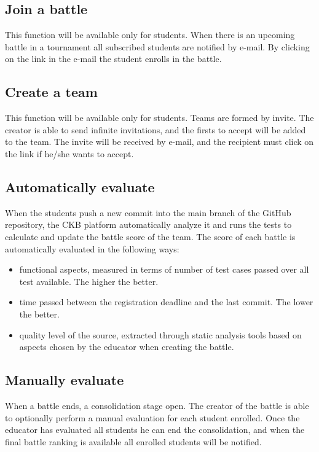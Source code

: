 \subsection{Join a battle}
This function will be available only for students. \newline 
When there is an upcoming battle in a tournament all subscribed students are notified by e-mail. By clicking on the link in the e-mail the student enrolls in the battle. 

\subsection{Create a team}
This function will be available only for students. \newline
Teams are formed by invite. The creator is able to send infinite invitations, and the firsts to accept will be added to the team.  \newline
The invite will be received by e-mail, and the recipient must click on the link if he/she wants to accept. 

\subsection{Automatically evaluate}
When the students push a new commit into the main branch of the GitHub repository, the CKB platform automatically analyze it and runs the tests to calculate and update the battle score of the team.\newline
The score of each battle is automatically evaluated in the following ways:
\begin{itemize}
        \item functional aspects, measured in terms of number of test cases passed over all test available. The higher the better.
        \item time passed between the registration deadline and the last commit. The lower the better.
        \item quality level of the source, extracted through static analysis tools based on aspects chosen by the educator when creating the battle. 
\end{itemize}

\subsection{Manually evaluate}
When a battle ends, a consolidation stage open. The creator of the battle is able to optionally perform a manual evaluation for each student enrolled.
Once the educator has evaluated all students he can end the consolidation, and when the final battle ranking is available all enrolled students will be notified.

